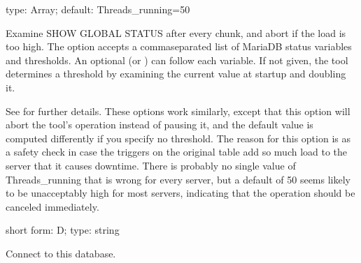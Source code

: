 \documentclass[letterpaper,10pt,english]{sphinxmanual}
\begin{document}
\begin{fulllineitems}
\label{\detokenize{mariadb-schema-change:cmdoption-mariadb-schema-change-critical-load}}
type: Array; default: Threads\_running=50

Examine SHOW GLOBAL STATUS after every chunk, and abort if the load is too high.
The option accepts a comma\sphinxhyphen{}separated list of MariaDB status variables and
thresholds.  An optional  (or ) can follow each
variable.  If not given, the tool determines a threshold by examining the
current value at startup and doubling it.

See {\hyperref[\detokenize{mariadb-schema-change:cmdoption-mariadb-schema-change-max-load}]{}} for further details. These options work similarly, except
that this option will abort the tool’s operation instead of pausing it, and the
default value is computed differently if you specify no threshold.  The reason
for this option is as a safety check in case the triggers on the original table
add so much load to the server that it causes downtime.  There is probably no
single value of Threads\_running that is wrong for every server, but a default of
50 seems likely to be unacceptably high for most servers, indicating that the
operation should be canceled immediately.

\end{fulllineitems}


\begin{fulllineitems}
\label{\detokenize{mariadb-schema-change:cmdoption-mariadb-schema-change-database}}
short form: \sphinxhyphen{}D; type: string

Connect to this database.

\end{fulllineitems}
\end{document}
